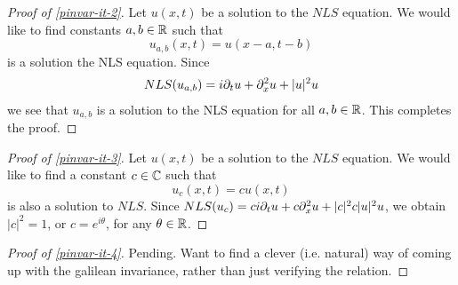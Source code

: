 %
%
\begin{proof}[Proof of \eqref{pinvar-it-2}] Let $u(x, t)$ be a solution to the $NLS$ equation.
We would like to find constants
$a, b \in \mathbb{R}$ such that $$u_{a,b}(x,t) = u(x -a, t - b)$$ is a solution the NLS
equation. Since
%
%
\begin{equation*}
\begin{split}
  NLS(u_{a,b}) = i \partial_t u + \partial_x^{2} u  + | u |^{2} u 
\end{split}
\end{equation*}
%
%
we see that $u_{a,b}$ is a solution to the NLS equation for all $a, b \in \mathbb{R}$.
This completes the proof.
\end{proof}
%
%
\begin{proof}[Proof of \eqref{pinvar-it-3}]
Let $u(x, t)$ be a solution to the $NLS$ equation.
We would like to find a constant
$c \in \mathbb{C}$ such that
\[
u_c (x, t) = c u(x, t)
\]
is also a solution to $NLS$.  Since 
$NLS(u_{c}) = c i \partial_{t} u  + c \partial_{x}^{2} u + |c|^2c | u |^{2}u$, we obtain
$|c|^{2} = 1$, or $c = e^{i \theta}$, for any $\theta \in \mathbb{R}$.
\end{proof}
%
%
\begin{proof}[Proof of \eqref{pinvar-it-4}]
Pending. Want to find a clever (i.e. natural)
way of coming up with the galilean invariance, rather than just verifying the relation.
\end{proof}
%
%
%
